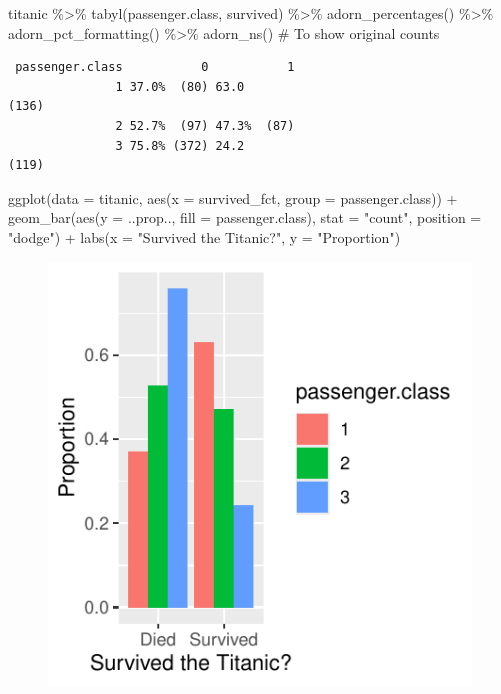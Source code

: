 \documentclass[
  letterpaper,
  DIV=11,
  numbers=noendperiod]{scrartcl}
\newenvironment{Shaded}{\begin{snugshade}}{\end{snugshade}}
\newcommand{\AttributeTok}[1]{\textcolor[rgb]{0.40,0.45,0.13}{#1}}
\newcommand{\CommentTok}[1]{\textcolor[rgb]{0.37,0.37,0.37}{#1}}
\newcommand{\FunctionTok}[1]{\textcolor[rgb]{0.28,0.35,0.67}{#1}}
\newcommand{\NormalTok}[1]{\textcolor[rgb]{0.00,0.23,0.31}{#1}}
\newcommand{\SpecialCharTok}[1]{\textcolor[rgb]{0.37,0.37,0.37}{#1}}
\newcommand{\StringTok}[1]{\textcolor[rgb]{0.13,0.47,0.30}{#1}}
\begin{document}
\begin{tcolorbox}
\begin{Shaded}
\begin{Highlighting}[]
\NormalTok{titanic }\SpecialCharTok{\%\textgreater{}\%}
  \FunctionTok{tabyl}\NormalTok{(passenger.class, survived) }\SpecialCharTok{\%\textgreater{}\%}
  \FunctionTok{adorn\_percentages}\NormalTok{() }\SpecialCharTok{\%\textgreater{}\%}
  \FunctionTok{adorn\_pct\_formatting}\NormalTok{() }\SpecialCharTok{\%\textgreater{}\%}
  \FunctionTok{adorn\_ns}\NormalTok{() }\CommentTok{\# To show original counts}
\end{Highlighting}
\end{Shaded}

\begin{verbatim}
 passenger.class           0           1
               1 37.0%  (80) 63.0                                     (136)
               2 52.7%  (97) 47.3%  (87)
               3 75.8% (372) 24.2                                     (119)
\end{verbatim}

\begin{Shaded}
\begin{Highlighting}[]
\FunctionTok{ggplot}\NormalTok{(}\AttributeTok{data =}\NormalTok{ titanic, }\FunctionTok{aes}\NormalTok{(}\AttributeTok{x =}\NormalTok{ survived\_fct, }\AttributeTok{group =}\NormalTok{ passenger.class)) }\SpecialCharTok{+}
  \FunctionTok{geom\_bar}\NormalTok{(}\FunctionTok{aes}\NormalTok{(}\AttributeTok{y =}\NormalTok{ ..prop.., }\AttributeTok{fill =}\NormalTok{ passenger.class),}
            \AttributeTok{stat =} \StringTok{"count"}\NormalTok{, }\AttributeTok{position =} \StringTok{"dodge"}\NormalTok{) }\SpecialCharTok{+}
  \FunctionTok{labs}\NormalTok{(}\AttributeTok{x =} \StringTok{"Survived the Titanic?"}\NormalTok{, }\AttributeTok{y =} \StringTok{"Proportion"}\NormalTok{)}
\end{Highlighting}
\end{Shaded}

\begin{figure}[H]

{\centering \includegraphics{about_files/figure-pdf/unnamed-chunk-14-1.pdf}

}
\end{figure}
\end{tcolorbox}
\end{document}
